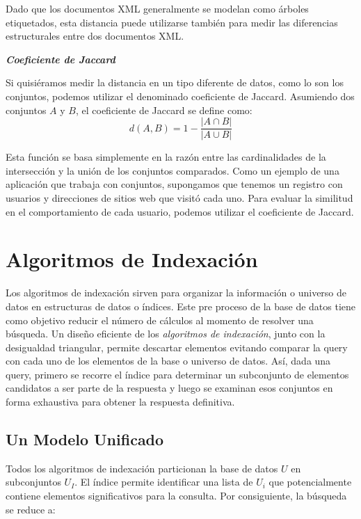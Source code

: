 Dado que los documentos XML generalmente se modelan como \'arboles etiquetados, esta distancia 
puede utilizarse tambi\'en para medir las diferencias estructurales entre dos documentos XML.

\noindent \textbf{\textit{Coeficiente de Jaccard}}

Si quisi\'eramos medir la distancia en un tipo diferente de datos, como lo son los conjuntos, 
podemos utilizar el denominado coeficiente de Jaccard. Asumiendo dos conjuntos $A$ y $B$, el 
coeficiente de Jaccard se define como:
\[
d(A,B) = 1 - \frac{|A \cap B|}{|A\cup B|}
\]

Esta funci\'on se basa simplemente en la raz\'on entre las cardinalidades de la intersecci\'on y 
la uni\'on de los conjuntos comparados. Como un ejemplo de una aplicaci\'on que trabaja con 
conjuntos, supongamos que tenemos un registro con usuarios y direcciones de sitios web que 
visit\'o cada uno. Para evaluar la similitud en el comportamiento de cada usuario, podemos 
utilizar el coeficiente de Jaccard.


\section{Algoritmos de Indexaci\'on}

Los algoritmos de indexaci\'on sirven para organizar la informaci\'on o universo de datos en
 estructuras de datos o \'indices. Este pre proceso de la base de datos tiene como objetivo
  reducir el n\'umero de c\'alculos al momento de resolver una b\'usqueda. Un dise\~no eficiente 
  de los \textit{algoritmos de indexaci\'on}, junto con la desigualdad triangular, permite 
  descartar   elementos evitando comparar la query con cada uno de los elementos de la base o 
  universo de datos. As\'i, dada una query, primero se recorre el \'indice para determinar un 
  subconjunto de elementos candidatos a ser parte de la respuesta y luego se examinan esos 
  conjuntos en forma exhaustiva para obtener la respuesta definitiva.

\subsection{Un Modelo Unificado}

Todos los algoritmos de indexaci\'on particionan la base de datos $U$ en subconjuntos $U_I$. El \'indice permite identificar una lista de $U_i$ que potencialmente contiene elementos significativos para la consulta. Por consiguiente, la b\'usqueda se reduce a:

